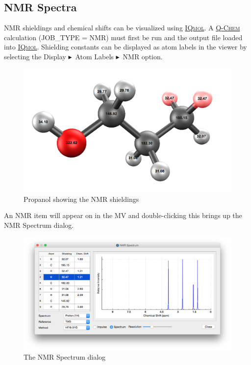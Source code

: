 \documentclass[a4paper,12pt]{article}
\newcommand{\qchem}{\href{https://q-chem.com}{{\scshape Q-Chem}}}
\newcommand{\iqmol}{\href{https://www.iqmol.org}{{\scshape IQmol}}}
\newcommand{\bt}{\ensuremath{\blacktriangleright}}
\begin{document}
\subsection{NMR Spectra}

NMR shieldings and chemical shifts can be visualized using \iqmol{}.  A 
\qchem{} calculation (JOB\_TYPE = NMR) must first be run and the output
file loaded into \iqmol{}.  Shielding constants can be displayed as atom labels
in the viewer by selecting the Display \bt\ Atom Labels \bt\ NMR option.
\begin{figure}[h]
\begin{center}
\includegraphics[scale=0.20]{figures/NmrDisplay.png}
\caption{Propanol showing the NMR shieldings}
\end{center}
\end{figure}

An NMR item will appear on in the MV and double-clicking this brings up the NMR
Spectrum dialog.
\begin{figure}[h]
\begin{center}
\includegraphics[scale=0.35]{figures/NmrConfigurator.png}
\caption{The NMR Spectrum dialog}
\end{center}
\end{figure}
\end{document}
